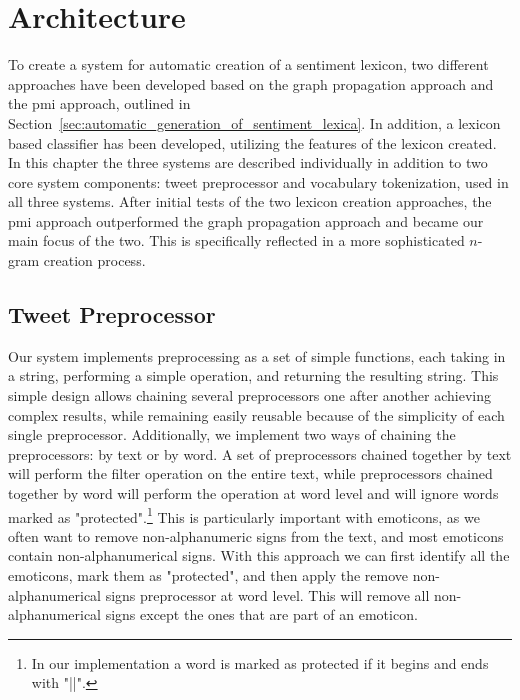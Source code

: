 \chapter{Architecture}
\label{cha:architecture}

To create a system for automatic creation of a sentiment lexicon, two different approaches have been developed based on the graph propagation approach and the \ac{pmi} approach, outlined in Section~\ref{sec:automatic_generation_of_sentiment_lexica}. In addition, a lexicon based classifier has been developed, utilizing the features of the lexicon created. In this chapter the three systems are described individually in addition to two core system components: tweet preprocessor and vocabulary tokenization, used in all three systems. After initial tests of the two lexicon creation approaches, the \ac{pmi} approach outperformed the graph propagation approach and became our main focus of the two. This is specifically reflected in a more sophisticated $n$-gram creation process. 


\section{Tweet Preprocessor} 
\label{sec:tweet_preprocessor}
Our system implements preprocessing as a set of simple functions, each taking in a string, performing a simple operation, and returning the resulting string. This simple design allows chaining several preprocessors one after another achieving complex results, while remaining easily reusable because of the simplicity of each single preprocessor. Additionally, we implement two ways of chaining the preprocessors: by text or by word. A set of preprocessors chained together by text will perform the filter operation on the entire text, while preprocessors chained together by word will perform the operation at word level and will ignore words marked as "protected".\footnote{In our implementation a word is marked as protected if it begins and ends with "||".} This is particularly important with emoticons, as we often want to remove non-alphanumeric signs from the text, and most emoticons contain non-alphanumerical signs. With this approach we can first identify all the emoticons, mark them as "protected", and then apply the remove non-alphanumerical signs preprocessor at word level. This will remove all non-alphanumerical signs except the ones that are part of an emoticon. \\

